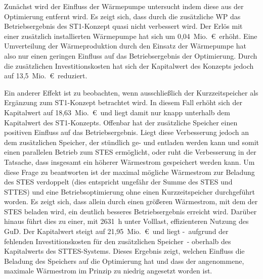 Zunächst wird der Einfluss der Wärmepumpe untersucht indem diese aus der Optimierung entfernt wird. Es zeigt sich, dass durch die zusätzliche \ac{WP} das Betriebsergebnis des ST1-Konzept quasi nicht verbessert wird. Der Erlös mit einer zusätzlich installierten Wärmepumpe hat sich um 0,04~Mio.~\euro\ erhöht. Eine Umverteilung der Wärmeproduktion durch den Einsatz der Wärmepumpe hat also nur einen geringen Einfluss auf das Betriebsergebnis der Optimierung. Durch die zusätzlichen Investitionskosten hat sich der Kapitalwert des Konzepts jedoch auf 13,5~Mio.~\euro\ reduziert. 

Ein anderer Effekt ist zu beobachten, wenn ausschließlich der Kurzzeitspeicher als Ergänzung zum ST1-Konzept betrachtet wird. In diesem Fall erhöht sich der Kapitalwert auf 18,63~Mio.~\euro\ und liegt damit nur knapp unterhalb dem Kapitalwert des ST1-Konzepts. Offenbar hat der zusätzliche Speicher einen positiven Einfluss auf das Betriebsergebnis. Liegt diese Verbesserung jedoch an dem zusätzlichen Speicher, der stündlich ge- und entladen werden kann und somit einen parallelen Betrieb zum \ac{STES} ermöglicht, oder ruht die Verbesserung in der Tatsache, dass insgesamt ein höherer Wärmestrom gespeichert werden kann. Um diese Frage zu beantworten ist der maximal mögliche Wärmestrom zur Beladung des \ac{STES} verdoppelt (dies entspricht ungefähr der Summe des \ac{STES} und \ac{STTES}) und eine Betriebsoptimierung ohne einen Kurzzeitspeicher durchgeführt worden. Es zeigt sich, dass allein durch einen größeren Wärmestrom, mit dem der \ac{STES} beladen wird, ein deutlich besseres Betriebsergebnis erreicht wird. Darüber hinaus führt dies zu einer, mit 2631~h unter Volllast, effizienteren Nutzung des \ac{GuD}. Der Kapitalwert steigt auf 21,95~Mio.~\euro\ und liegt -~aufgrund der fehlenden Investitionskosten für den zusätzlichen Speicher~- oberhalb des Kapitalwerts des \ac{STTES}-Systems. Dieses Ergebnis zeigt, welchen Einfluss die Beladung des Speichers auf die Optimierung hat und dass der angenommene, maximale Wärmestrom im Prinzip zu niedrig angesetzt worden ist.

